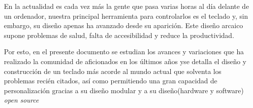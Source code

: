 En la actualidad es cada vez más la gente que pasa varias horas al día delante de un ordenador, nuestra principal herramienta para controlarlos es el teclado y, sin embargo, su diseño apenas ha avanzado desde su aparición. Este diseño arcaico supone problemas de salud, falta de accesibilidad y reduce la productividad. \vspace{0.3cm} \par

Por esto, en el presente documento se estudian los avances y variaciones que ha realizado la comunidad de aficionados en los últimos años yse detalla el diseño y construcción de un teclado más acorde al mundo actual que solventa los problemas recién citados, así como permitiendo una gran capacidad de personalización gracias a su diseño modular y a su diseño(hardware y software) \textit{open source}

